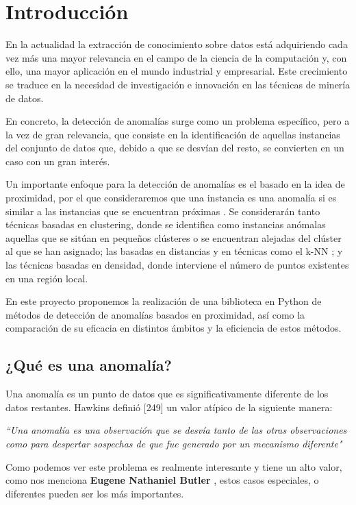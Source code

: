 
\chapter{Introducción}


En la actualidad la extracción de conocimiento sobre datos está
adquiriendo cada vez más una mayor relevancia en el campo de la
ciencia de la computación y, con ello, una mayor aplicación en el
mundo industrial y empresarial. Este crecimiento se traduce en la
necesidad de investigación e innovación en las técnicas de minería
de datos.


En concreto, la detección de anomalías surge como un problema
específico, pero a la vez de gran relevancia, que consiste en la
identificación de aquellas instancias del conjunto de datos que,
debido a que se desvían del resto, se convierten en un caso con
un gran interés.

Un importante enfoque para la detección de anomalías es el basado
en la idea de proximidad, por el que consideraremos que una instancia
es una anomalía si es similar a las instancias que se encuentran
próximas \cite{aggarwalOutlierAnalysis2017}.  Se considerarán tanto técnicas basadas en
clustering, donde se identifica como instancias anómalas aquellas
que se sitúan en pequeños clústeres o se encuentran alejadas del
clúster al que se han asignado; las basadas en distancias y en técnicas
como el k-NN \cite{ishimtsevConformalKNNAnomaly2017}; y las técnicas basadas en densidad,
donde interviene el número de puntos existentes en una región local.

En este proyecto proponemos la realización de una biblioteca en Python
de métodos de detección de anomalías basados en proximidad, así como
la comparación de su eficacia en distintos ámbitos y la eficiencia de
estos métodos.



\section{¿Qué es una anomalía?}
Una anomalía es un punto de datos que es significativamente diferente
de los datos restantes. Hawkins definió [249] un valor atípico de la siguiente manera:



\textit{
 ``Una anomalía es una observación que se desvía tanto de las
otras observaciones como para despertar sospechas de que fue generado
por un mecanismo diferente"}


Como podemos ver este problema es realmente interesante y tiene un alto valor,
como nos menciona \textbf{Eugene Nathaniel Butler} \cite{quotationsEugeneNathanielButler}, estos casos especiales,
o diferentes pueden ser los más importantes.

